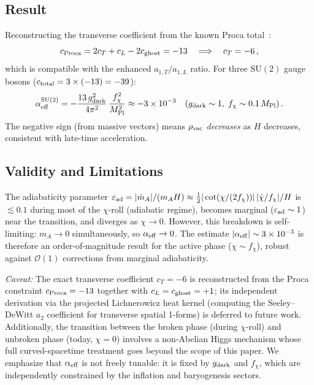 \documentclass[a4paper,11pt]{article}
\newcommand{\MPl}{M_{\rm Pl}}
\newcommand{\chif}{\chi}
\newcommand{\fchi}{f_\chi}
\newcommand{\SUt}{\mathrm{SU}(2)}
\newcommand{\e}[1]{\times 10^{#1}}
\begin{document}
\subsection{Result}

Reconstructing the transverse coefficient from the known Proca total~\cite{ParkerToms}:
\begin{equation}
c_{\rm Proca} = 2c_T + c_L - 2c_{\rm ghost} = -13 \quad \Longrightarrow \quad c_T = -6\,,
\end{equation}
which is compatible with the enhanced $a_{1,T}/a_{1,L}$ ratio. For three $\SUt$ gauge bosons ($c_{\rm total} = 3 \times (-13) = -39$):
\begin{equation}
\alpha_{\rm eff}^{\SUt} = -\frac{13\,g_{\rm dark}^2}{4\pi^2}\,\frac{\fchi^2}{\MPl^2} \approx -3\e{-3} \quad (g_{\rm dark} \sim 1,\; \fchi \sim 0.1\,\MPl)\,.
\end{equation}
The negative sign (from massive vectors) means $\rho_{\rm vac}$ \textit{decreases} as $H$ decreases, consistent with late-time acceleration.

\subsection{Validity and Limitations}

The adiabaticity parameter $\varepsilon_{\rm ad} = |\dot{m}_A|/(m_A H) \approx \tfrac{1}{2}|\cot(\chif/(2\fchi))|\,|\dot{\chif}/\fchi|/H$ is $\lesssim 0.1$ during most of the $\chif$-roll (adiabatic regime), becomes marginal ($\varepsilon_{\rm ad} \sim 1$) near the transition, and diverges as $\chif \to 0$. However, this breakdown is self-limiting: $m_A \to 0$ simultaneously, so $\alpha_{\rm eff} \to 0$. The estimate $|\alpha_{\rm eff}| \sim 3\e{-3}$ is therefore an order-of-magnitude result for the active phase ($\chif \sim \fchi$), robust against $\mathcal{O}(1)$ corrections from marginal adiabaticity.

\textit{Caveat:} The exact transverse coefficient $c_T = -6$ is reconstructed from the Proca constraint $c_{\rm Proca} = -13$ together with $c_L = c_{\rm ghost} = +1$; its independent derivation via the projected Lichnerowicz heat kernel (computing the Seeley--DeWitt $a_2$ coefficient for transverse spatial 1-forms) is deferred to future work. Additionally, the transition between the broken phase (during $\chif$-roll) and unbroken phase (today, $\chif = 0$) involves a non-Abelian Higgs mechanism whose full curved-spacetime treatment goes beyond the scope of this paper. We emphasize that $\alpha_{\rm eff}$ is not freely tunable: it is fixed by $g_{\rm dark}$ and $\fchi$, which are independently constrained by the inflation and baryogenesis sectors.
\end{document}
